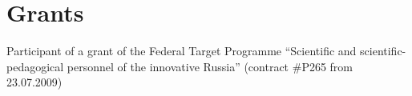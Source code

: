 
\section{Grants}
Participant of a grant of the Federal Target Programme “Scientiﬁc and
scientiﬁc-pedagogical personnel of the innovative Russia” (contract \#P265
from 23.07.2009)


